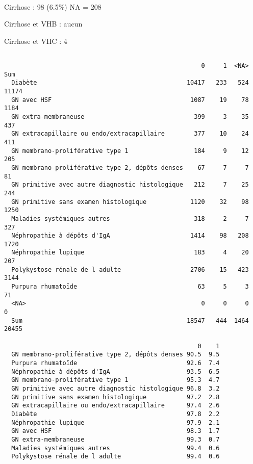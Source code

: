 \documentclass[11pt,a4paper]{article}\usepackage[]{graphicx}\usepackage[]{color}
\makeatletter
\newenvironment{kframe}{%
 \def\at@end@of@kframe{}%
 \ifinner\ifhmode%
  \def\at@end@of@kframe{\end{minipage}}%
  \begin{minipage}{\columnwidth}%
 \fi\fi%
 \def\FrameCommand##1{\hskip\@totalleftmargin \hskip-\fboxsep
 \colorbox{shadecolor}{##1}\hskip-\fboxsep
     \hskip-\linewidth \hskip-\@totalleftmargin \hskip\columnwidth}%
 \MakeFramed {\advance\hsize-\width
   \@totalleftmargin\z@ \linewidth\hsize
   \@setminipage}}%
 {\par\unskip\endMakeFramed%
 \at@end@of@kframe}
\newenvironment{knitrout}{}{} %
\makeatother
\begin{document}
~\\

Cirrhose : 98 (6.5\%) NA = 208

Cirrhose et VHB : aucun

Cirrhose et VHC : 4

\begin{knitrout}
\color{fgcolor}\begin{kframe}
\begin{verbatim}
                                                 
                                                      0     1  <NA>   Sum
  Diabète                                         10417   233   524 11174
  GN avec HSF                                      1087    19    78  1184
  GN extra-membraneuse                              399     3    35   437
  GN extracapillaire ou endo/extracapillaire        377    10    24   411
  GN membrano-proliférative type 1                  184     9    12   205
  GN membrano-proliférative type 2, dépôts denses    67     7     7    81
  GN primitive avec autre diagnostic histologique   212     7    25   244
  GN primitive sans examen histologique            1120    32    98  1250
  Maladies systémiques autres                       318     2     7   327
  Néphropathie à dépôts d'IgA                      1414    98   208  1720
  Néphropathie lupique                              183     4    20   207
  Polykystose rénale de l adulte                   2706    15   423  3144
  Purpura rhumatoïde                                 63     5     3    71
  <NA>                                                0     0     0     0
  Sum                                             18547   444  1464 20455
                                                 
                                                     0    1
  GN membrano-proliférative type 2, dépôts denses 90.5  9.5
  Purpura rhumatoïde                              92.6  7.4
  Néphropathie à dépôts d'IgA                     93.5  6.5
  GN membrano-proliférative type 1                95.3  4.7
  GN primitive avec autre diagnostic histologique 96.8  3.2
  GN primitive sans examen histologique           97.2  2.8
  GN extracapillaire ou endo/extracapillaire      97.4  2.6
  Diabète                                         97.8  2.2
  Néphropathie lupique                            97.9  2.1
  GN avec HSF                                     98.3  1.7
  GN extra-membraneuse                            99.3  0.7
  Maladies systémiques autres                     99.4  0.6
  Polykystose rénale de l adulte                  99.4  0.6
\end{verbatim}
\end{kframe}
\end{knitrout}
\end{document}
